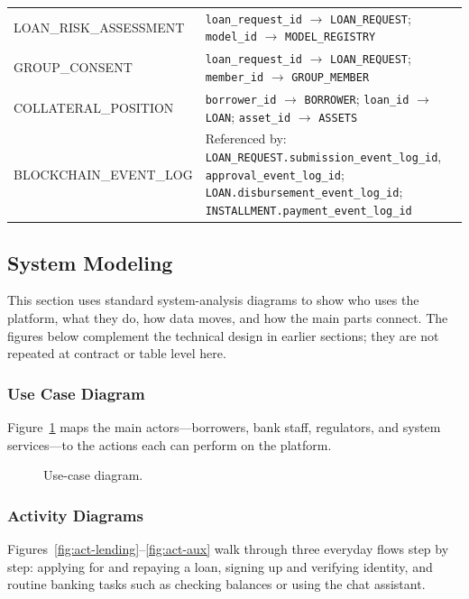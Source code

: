 \begin{table}[H]
\begin{tabular}{@{}p{3.5cm}p{8.5cm}@{}}
LOAN\_RISK\_ASSESSMENT & \texttt{loan\_request\_id} $\to$ \texttt{LOAN\_REQUEST}; \texttt{model\_id} $\to$ \texttt{MODEL\_REGISTRY} \\
GROUP\_CONSENT & \texttt{loan\_request\_id} $\to$ \texttt{LOAN\_REQUEST}; \texttt{member\_id} $\to$ \texttt{GROUP\_MEMBER} \\
COLLATERAL\_POSITION & \texttt{borrower\_id} $\to$ \texttt{BORROWER}; \texttt{loan\_id} $\to$ \texttt{LOAN}; \texttt{asset\_id} $\to$ \texttt{ASSETS} \\
BLOCKCHAIN\_EVENT\_LOG & Referenced by: \texttt{LOAN\_REQUEST.submission\_event\_log\_id}, \texttt{approval\_event\_log\_id}; \texttt{LOAN.disbursement\_event\_log\_id}; \texttt{INSTALLMENT.payment\_event\_log\_id} \\
\bottomrule
\end{tabular}
\end{table}

\subsection{System Modeling}
\label{sec:system-modeling}

This section uses standard system-analysis diagrams to show who uses the platform, what they do, how data moves, and how the main parts connect. The figures below complement the technical design in earlier sections; they are not repeated at contract or table level here.

\subsubsection{Use Case Diagram}
\label{sec:usecase}

Figure~\ref{fig:usecase} maps the main actors---borrowers, bank staff, regulators, and system services---to the actions each can perform on the platform.

\begin{figure}[H]
\centering
{}
\caption[Use-case diagram]{Use-case diagram.}
\label{fig:usecase}
\end{figure}

\subsubsection{Activity Diagrams}

Figures~\ref{fig:act-lending}--\ref{fig:act-aux} walk through three everyday flows step by step: applying for and repaying a loan, signing up and verifying identity, and routine banking tasks such as checking balances or using the chat assistant.

